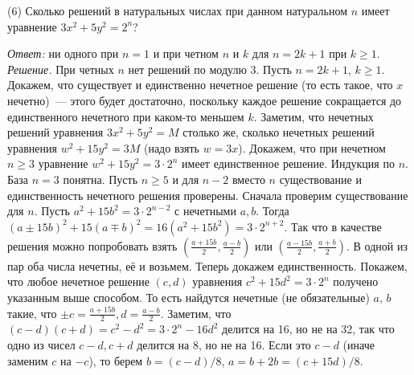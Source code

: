\textsf{(6)}
Сколько решений в натуральных числах при данном натуральном $n$ имеет уравнение
$3 x^2 + 5 y^2 = 2^n$?

\solution
\emph{Ответ:}
ни одного при $n = 1$ и при четном $n$ и $k$ для $n = 2 k + 1$ при $k \geq 1$.
\emph{Решение.}
При четных $n$ нет решений по модулю 3.
Пусть $n = 2 k + 1$, $k \geq 1$.
Докажем, что существует и единственно нечетное решение
(то есть такое, что $x$ нечетно)~--- этого будет достаточно, поскольку каждое
решение сокращается до единственного нечетного при каком-то меньшем $k$.
Заметим, что нечетных решений уравнения $3 x^2 + 5 y^2 = M$ столько же, сколько
нечетных решений уравнения $w^2 + 15 y^2 = 3 M$ (надо взять $w = 3 x$).
Докажем, что при нечетном $n \geq 3$ уравнение $w^2 + 15 y^2 = 3 \cdot 2^n$
имеет единственное решение.
Индукция по $n$.
База $n = 3$ понятна.
Пусть $n \geq 5$ и для $n - 2$ вместо $n$ существование и единственность
нечетного решения проверены.
Сначала проверим существование для $n$.
Пусть $a^2 + 15 b^2 = 3 \cdot 2^{n - 2}$ с нечетными $a, b$.
Тогда
\(
    (a \pm 15 b)^2 + 15(a \mp b)^2
=
    16(a^2 + 15 b^2)
=
    3 \cdot 2^{n + 2}
\).
Так что в качестве решения можно попробовать взять
$(\frac{a + 15 b}{2}, \frac{a - b}{2})$
или
$(\frac{a - 15 b}{2}, \frac{a + b}{2})$.
В одной из пар оба числа нечетны, её и возьмем.
Теперь докажем единственность.
Покажем, что любое нечетное решение $(c, d)$ уравнения
$c^2 + 15 d^2 = 3 \cdot 2^n$ получено указанным выше способом.
То есть найдутся нечетные (не обязательные) $a$, $b$ такие, что
$\pm c = \frac{a + 15 b}{2}, d = \frac{a - b}{2}$.
Заметим, что $(c - d)(c + d) = c^2 - d^2 = 3 \cdot 2^n - 16 d^2$ делится на 16,
но не на 32, так что одно из чисел $c - d, c + d$ делится на 8, но не на 16.
Если это $c - d$ (иначе заменим $c$ на $-c$), то берем $b = (c - d) / 8$,
$a = b + 2 b = (c + 15 d) / 8$.

